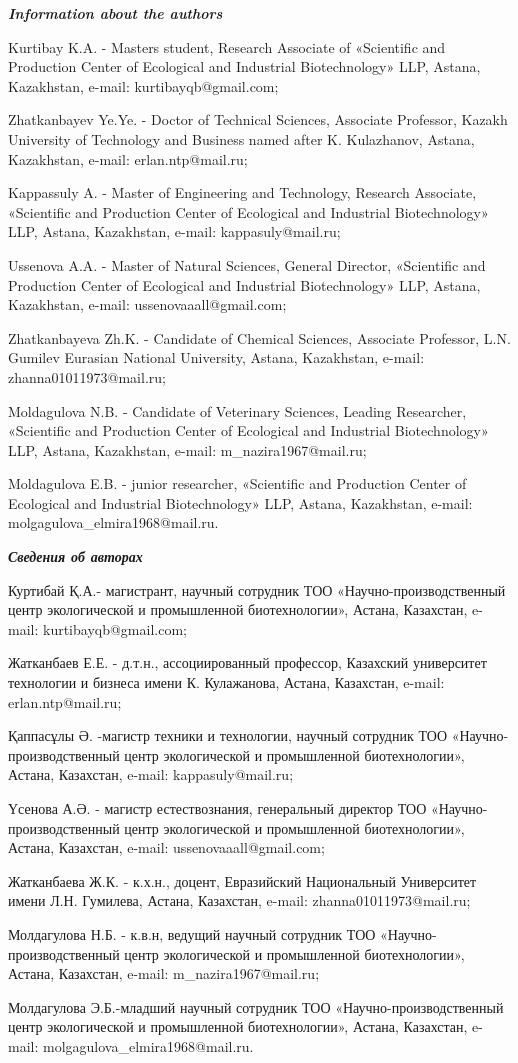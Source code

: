 \emph{{\bfseries Information about the authors}}

Kurtibay K.A. - Master\textquotesingle s student, Research Associate of
«Scientific and Production Center of Ecological and Industrial
Biotechnology» LLP, Astana, Kazakhstan, e-mail: kurtibayqb@gmail.com;

Zhatkanbayev Ye.Ye. - Doctor of Technical Sciences, Associate Professor,
Kazakh University of Technology and Business named after K. Kulazhanov,
Astana, Kazakhstan, e-mail: erlan.ntp@mail.ru;

Kappassuly A. - Master of Engineering and Technology, Research
Associate, «Scientific and Production Center of Ecological and
Industrial Biotechnology» LLP, Astana, Kazakhstan, e-mail:
kappasuly@mail.ru;

Ussenova A.A. - Master of Natural Sciences, General Director,
«Scientific and Production Center of Ecological and Industrial
Biotechnology» LLP, Astana, Kazakhstan, e-mail: ussenovaaall@gmail.com;

Zhatkanbayeva Zh.K. - Candidate of Chemical Sciences, Associate
Professor, L.N. Gumilev Eurasian National University, Astana,
Kazakhstan, e-mail: zhanna01011973@mail.ru;

Moldagulova N.B. - Candidate of Veterinary Sciences, Leading Researcher,
«Scientific and Production Center of Ecological and Industrial
Biotechnology» LLP, Astana, Kazakhstan, e-mail: m\_nazira1967@mail.ru;

Moldagulova E.B. - junior researcher, «Scientific and Production Center
of Ecological and Industrial Biotechnology» LLP, Astana, Kazakhstan,
e-mail: molgagulova\_elmira1968@mail.ru.

\emph{{\bfseries Сведения об авторах}}

Куртибай Қ.А.- магистрант, научный сотрудник ТОО
«Научно-производственный центр экологической и промышленной
биотехнологии», Астана, Казахстан, e-mail: kurtibayqb@gmail.com;

Жатканбаев Е.Е. - д.т.н., ассоциированный профессор, Казахский
университет технологии и бизнеса имени К. Кулажанова, Астана, Казахстан,
e-mail: erlan.ntp@mail.ru;

Қаппасұлы Ә. -магистр техники и технологии, научный сотрудник ТОО
«Научно-производственный центр экологической и промышленной
биотехнологии», Астана, Казахстан, e-mail: kappasuly@mail.ru;

Үсенова А.Ә. - магистр естествознания, генеральный директор ТОО
«Научно-производственный центр экологической и промышленной
биотехнологии», Астана, Казахстан, e-mail: ussenovaaall@gmail.com;

Жатканбаева Ж.К. - к.х.н., доцент, Евразийский Национальный Университет
имени Л.Н. Гумилева, Астана, Казахстан, e-mail: zhanna01011973@mail.ru;

Молдагулова Н.Б. - к.в.н, ведущий научный сотрудник ТОО
«Научно-производственный центр экологической и промышленной
биотехнологии», Астана, Казахстан, e-mail: m\_nazira1967@mail.ru;

Молдагулова Э.Б.-младший научный сотрудник ТОО «Научно-производственный
центр экологической и промышленной биотехнологии», Астана, Казахстан,
e-mail: molgagulova\_elmira1968@mail.ru.